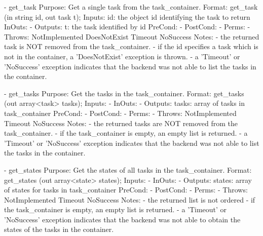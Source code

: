\begin{myspec}
 
    - get_task
      Purpose:  Get a single task from the task_container.
      Format:   get_task             (in  string   id,
                                      out task     t);
      Inputs:   id:                   the object id identifying
                                      the task to return
      InOuts:   -
      Outputs:  t:                    the task identified by
                                      id
      PreCond:  -
      PostCond: -
      Perms:    -
      Throws:   NotImplemented
                DoesNotExist
                Timeout
                NoSuccess
      Notes:    - the returned task is NOT removed from the
                  task_container.
                - if the id specifies a task which is not in 
                  the container, a 'DoesNotExist' exception is
                  thrown.
                - a 'Timeout' or 'NoSuccess' exception indicates
                  that the backend was not able to list the
                  tasks in the container.
 
 
    - get_tasks 
      Purpose:  Get the tasks in the task_container.
      Format:   get_tasks            (out array<task>   tasks);
      Inputs:   -
      InOuts:   -
      Outputs:  tasks:                array of tasks in
                                      task_container
      PreCond:  -
      PostCond: -
      Perms:    -
      Throws:   NotImplemented
                Timeout
                NoSuccess
      Notes:    - the returned tasks are NOT removed from the
                  task_container.
                - if the task_container is empty, an
                  empty list is returned.
                - a 'Timeout' or 'NoSuccess' exception indicates
                  that the backend was not able to list the
                  tasks in the container.
 
 
    - get_states
      Purpose:  Get the states of all tasks in the 
                task_container.
      Format:   get_states           (out array<state>   states);
      Inputs:   -
      InOuts:   -
      Outputs:  states:               array of states for
                                      tasks in task_container
      PreCond:  -
      PostCond: -
      Perms:    -
      Throws:   NotImplemented
                Timeout
                NoSuccess
      Notes:    - the returned list is not ordered
                - if the task_container is empty, an
                  empty list is returned.
                - a 'Timeout' or 'NoSuccess' exception indicates
                  that the backend was not able to obtain the
                  states of the tasks in the container.
 \end{myspec}
 
